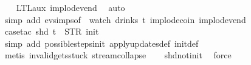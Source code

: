 {\ \ \isamarkupfalse%
\ LTL{\isacharunderscore}aux{}\ implode{\isacharunderscore}vend\ \isamarkupfalse%
\ auto{\isacharbrackleft}{}{\isacharbrackright}\isanewline
\isanewline
\ \ \isamarkupfalse%
\ {\isacharparenleft}simp\ add{\isacharcolon}\ ev{\isachardot}simps{\isacharbrackleft}of\ {\isacharunderscore}\ {\isachardoublequoteopen}watch\ drinks\ t{\isachardoublequoteclose}{\isacharbrackright}\ implode{\isacharunderscore}coin\ implode{\isacharunderscore}vend{\isacharparenright}\isanewline
\ \ \isamarkupfalse%
\ {\isacharparenleft}case{\isacharunderscore}tac\ {\isachardoublequoteopen}shd\ t\ {\isacharequal}\ {\isacharparenleft}STR\ {\isacharprime}{\isacharprime}init{\isacharprime}{\isacharprime}{\isacharcomma}\ {\isacharbrackleft}{\isacharbrackright}{\isacharparenright}{\isachardoublequoteclose}{\isacharparenright}\isanewline
\ \ \ \isamarkupfalse%
\ {\isacharparenleft}simp\ add{\isacharcolon}\ possible{\isacharunderscore}steps{\isacharunderscore}init\ apply{\isacharunderscore}updates{\isacharunderscore}def\ init{\isacharunderscore}def{\isacharparenright}\isanewline
\ \ \ \isamarkupfalse%
\ {\isacharparenleft}metis\ invalid{\isacharunderscore}gets{\isacharunderscore}stuck\ stream{\isachardot}collapse{\isacharparenright}\isanewline
\ \ \isamarkupfalse%
\ shd{\isacharunderscore}not{\isacharunderscore}init\ \isamarkupfalse%
\ force%
\endisatagproof
{\isafoldproof}%
%
\isadelimproof
%
\endisadelimproof
%
}%
